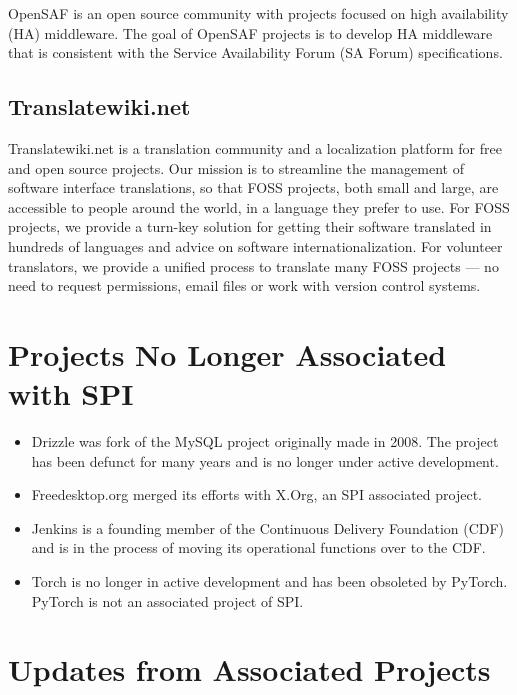 \documentclass[a4paper]{report}
\begin{document}
OpenSAF is an open source community with projects focused on high
availability (HA) middleware.  The goal of OpenSAF projects is to
develop HA middleware that is consistent with the Service Availability
Forum (SA Forum) specifications.

\subsection{Translatewiki.net}

Translatewiki.net is a translation community and a localization platform
for free and open source projects. Our mission is to streamline the
management of software interface translations, so that FOSS projects,
both small and large, are accessible to people around the world, in a
language they prefer to use. For FOSS projects, we provide a turn-key
solution for getting their software translated in hundreds of languages
and advice on software internationalization. For volunteer translators,
we provide a unified process to translate many FOSS projects ---  no
need to request permissions, email files or work with version control
systems.

\section{Projects No Longer Associated with SPI}

\begin{itemize}

\item Drizzle was fork of the MySQL project originally made in 2008.
The project has been defunct for many years and is no longer under
active development.

\item Freedesktop.org merged its efforts with X.Org, an SPI associated
project.

\item Jenkins is a founding member of the Continuous Delivery Foundation
(CDF) and is in the process of moving its operational functions over to
the CDF.

\item Torch is no longer in active development and has been obsoleted
by PyTorch.  PyTorch is not an associated project of SPI.

\end{itemize}

\section{Updates from Associated Projects}
\end{document}
